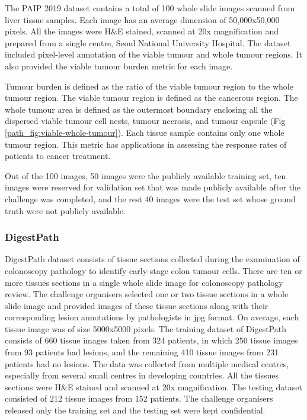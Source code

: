 \documentclass[times,twocolumn,final,authoryear]{tmp}
\begin{document}
The PAIP 2019 \citep{paip} dataset contains a total of 100 whole slide images scanned from liver tissue samples. Each image has an average dimension of 50,000x50,000 pixels. All the images were H\&E stained, scanned at 20x magnification and prepared from a single centre, Seoul National University Hospital. The dataset included pixel-level annotation of the viable tumour and whole tumour regions. It also provided the viable tumour burden metric for each image.

Tumour burden is defined as the ratio of the viable tumour region to the whole tumour region. The viable tumour region is defined as the cancerous region. The whole tumour area is defined as the outermost boundary enclosing all the dispersed viable tumour cell nests, tumour necrosis, and tumour capsule (Fig \ref{path_fig:viable-whole-tumour}). Each tissue sample contains only one whole tumour region. This metric has applications in assessing the response rates of patients to cancer treatment.

Out of the 100 images, 50 images were the publicly available training set, ten images were reserved for validation set that was made publicly available after the challenge was completed, and the rest 40 images were the test set whose ground truth were not publicly available.

\subsubsection{DigestPath}
DigestPath dataset consists of tissue sections collected during the examination of colonoscopy pathology to identify early-stage colon tumour cells. There are ten or more tissues sections in a single whole slide image for colonoscopy pathology review. The challenge organisers selected one or two tissue sections in a whole slide image and provided images of these tissue sections along with their corresponding lesion annotations by pathologists in jpg format. On average, each tissue image was of size 5000x5000 pixels. The training dataset of DigestPath consists of 660 tissue images taken from 324 patients, in which 250 tissue images from 93 patients had lesions, and the remaining 410 tissue images from 231 patients had no lesions. The data was collected from multiple medical centres, especially from several small centres in developing countries. All the tissues sections were H\&E stained and scanned at 20x magnification. The testing dataset consisted of 212 tissue images from 152 patients. The challenge organisers released only the training set and the testing set were kept confidential. 
\end{document}
